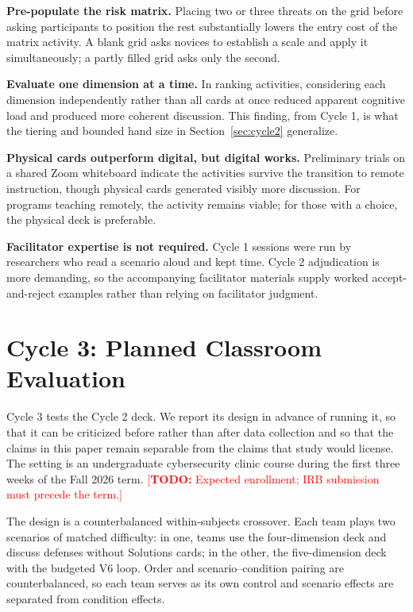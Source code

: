 \documentclass[10pt,twocolumn,letterpaper]{article}
\newcommand{\todo}[1]{\textcolor{red}{[\textbf{TODO:} #1]}}
\begin{document}
\textbf{Pre-populate the risk matrix.} Placing two or three threats on the grid
before asking participants to position the rest substantially lowers the entry
cost of the matrix activity. A blank grid asks novices to establish a scale and
apply it simultaneously; a partly filled grid asks only the second.

\textbf{Evaluate one dimension at a time.} In ranking activities, considering
each dimension independently rather than all cards at once reduced apparent
cognitive load and produced more coherent discussion. This finding, from Cycle
1, is what the tiering and bounded hand size in Section~\ref{sec:cycle2}
generalize.

\textbf{Physical cards outperform digital, but digital works.} Preliminary
trials on a shared Zoom whiteboard indicate the activities survive the
transition to remote instruction, though physical cards generated visibly more
discussion. For programs teaching remotely, the activity remains viable; for
those with a choice, the physical deck is preferable.

\textbf{Facilitator expertise is not required.} Cycle 1 sessions were run by
researchers who read a scenario aloud and kept time. Cycle 2 adjudication is more
demanding, so the accompanying facilitator materials supply worked
accept-and-reject examples rather than relying on facilitator judgment.

\section{Cycle 3: Planned Classroom Evaluation}
\label{sec:planned}

Cycle 3 tests the Cycle 2 deck. We report its design in advance of running it,
so that it can be criticized before rather than after data collection and so
that the claims in this paper remain separable from the claims that study would
license. The
setting is an undergraduate cybersecurity clinic course during the first three
weeks of the Fall 2026 term.
\todo{Expected enrollment; IRB submission must precede the term.}

The design is a counterbalanced within-subjects crossover. Each team plays two
scenarios of matched difficulty: in one, teams use the four-dimension deck and
discuss defenses without Solutions cards; in the other, the five-dimension deck
with the budgeted V6 loop. Order and scenario--condition pairing are
counterbalanced, so each team serves as its own control and scenario effects are
separated from condition effects.
\end{document}
